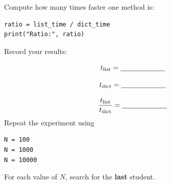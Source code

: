 \documentclass{article}
\begin{document}
Compute how many times faster one method is:

\begin{verbatim}
ratio = list_time / dict_time
print("Ratio:", ratio)
\end{verbatim}
\noindent
Record your results:

\[
t_{\mathrm{list}} = \underline{\hspace{2.2cm}}
\]

\[
t_{\mathrm{dict}} = \underline{\hspace{2.2cm}}
\]

\[
\frac{t_{\mathrm{list}}}
     {t_{\mathrm{dict}}}
=
\underline{\hspace{2.2cm}}
\]
\noindent
Repeat the experiment using

\begin{verbatim}
N = 100
N = 1000
N = 10000
\end{verbatim}

For each value of \(N\), search for the \textbf{last} student.
\end{document}
